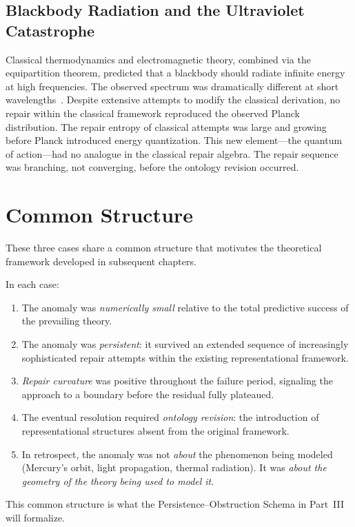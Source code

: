 \documentclass[12pt,oneside]{book}
\theoremstyle{plain}
\theoremstyle{definition}
\theoremstyle{remark}
\newcommand{\1}{\mathbf{1}}
\begin{document}
\subsection{Blackbody Radiation and the Ultraviolet Catastrophe}

Classical thermodynamics and electromagnetic theory, combined via the equipartition theorem, predicted that a blackbody should radiate infinite energy at high frequencies. The observed spectrum was dramatically different at short wavelengths~\cite{planck1901}. Despite extensive attempts to modify the classical derivation, no repair within the classical framework reproduced the observed Planck distribution. The repair entropy of classical attempts was large and growing before Planck introduced energy quantization. This new element---the quantum of action---had no analogue in the classical repair algebra. The repair sequence was branching, not converging, before the ontology revision occurred.

\section{Common Structure}

These three cases share a common structure that motivates the theoretical framework developed in subsequent chapters.

In each case:
\begin{enumerate}[label=(\roman*)]
\item The anomaly was \emph{numerically small} relative to the total predictive success of the prevailing theory.
\item The anomaly was \emph{persistent}: it survived an extended sequence of increasingly sophisticated repair attempts within the existing representational framework.
\item \emph{Repair curvature} was positive throughout the failure period, signaling the approach to a boundary before the residual fully plateaued.
\item The eventual resolution required \emph{ontology revision}: the introduction of representational structures absent from the original framework.
\item In retrospect, the anomaly was not \emph{about} the phenomenon being modeled (Mercury's orbit, light propagation, thermal radiation). It was \emph{about the geometry of the theory being used to model it}.
\end{enumerate}

This common structure is what the Persistence--Obstruction Schema in Part~III will formalize.
\end{document}
